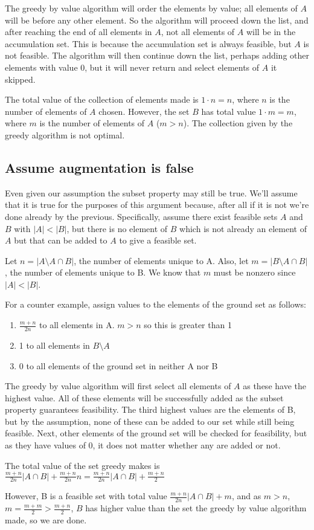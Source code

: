 \documentclass{article}
\begin{document}
The greedy by value algorithm will order the elements by value; all elements of $A$ will be before any other element. So the algorithm will proceed down the list, and after reaching the end of all elements in $A$, not all elements of $A$ will be in the accumulation set. This is because the accumulation set is always feasible, but $A$ is not feasible. The algorithm will then continue down the list, perhaps adding other elements with value $0$, but it will never return and select elements of $A$ it skipped.

The total value of the collection of elements made is $1\cdot n = n$, where $n$ is the number of elements of $A$ chosen. However, the set $B$ has total value $1 \cdot m = m$, where $m$ is the number of elements of $A$ ($m>n$). The collection given by the greedy algorithm is not optimal.


\subsection{Assume augmentation is false}
Even given our assumption the subset property may still be true. We'll assume that it is true for the purposes of this argument because, after all if it is not we're done already by the previous. Specifically, assume there exist feasible sets $A$ and $B$ with $|A| < |B|$, but there is no element of $B $ which is not already an element of  $ A$ but that can be added to $A$ to give a feasible set.

Let $n = |A \setminus A \cap B|$, the number of elements unique to A. Also, let $m = |B \setminus A \cap B|$, the number of elements unique to B. We know that $m$ must be nonzero since $|A| < |B|$.

For a counter example, assign values to the elements of the ground set as follows:
\begin{enumerate}
\item $\frac{m+n}{2n}$ to all elements in A. $m>n$ so this is greater than 1
\item 1 to all elements in $B\setminus A$
\item 0 to all elements of the ground set in neither A nor B
\end{enumerate}

The greedy by value algorithm will first select all elements of $A$ as these have the highest value. All of these elements will be successfully added as the subset property guarantees feasibility. The third highest values are the elements of B, but by the assumption, none of these can be added to our set while still being feasible. Next, other elements of the ground set will be checked for feasibility, but as they have values of 0, it does not matter whether any are added or not.

The total value of the set greedy makes is $\frac{m+n}{2n}|A \cap B| + \frac{m+n}{2n}n = \frac{m+n}{2n}|A \cap B| + \frac{m+n}{2}$

However, B is a feasible set with total value $\frac{m+n}{2n}|A \cap B| + m$, and as $m>n$, $m = \frac{m+m}{2} > \frac{m+n}{2}$, $B$ has higher value than the set the greedy by value algorithm made, so we are done.
\end{document}
